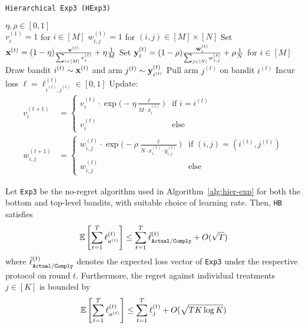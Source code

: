 \begin{algorithm}[tb]
   \caption{\texttt{Hierarchical Exp3 (HExp3)}}
   \label{alg:meta-exp2}
   \begin{algorithmic}   
       $\eta,\rho\in[0,1]$\\
      \STATE $v^{(1)}_{i}=1$ for $i\in[M]$
   	\STATE $w^{(1)}_{i,j}=1$ for $(i,j)\in[M]\times[N]$
	   \STATE Set ${\mathbf x}^{(t)} = (1-\eta) \frac{{\mathbf v}^{(t)}}{\sum_{i\in[M]} v^{(t)}_{i}} + \eta\frac{1}{M}$
	   \STATE Set ${\mathbf y}^{(t)}_{i} = (1-\rho)\frac{{\mathbf w}^{(t)}_{i}}{\sum_{j\in[N]} w^{(t)}_{i,j}} + \rho\frac{1}{N}$ for $i\in[M]$
	\STATE Draw bandit $i^{(t)}\sim {\mathbf x}^{(t)}$ and arm $j^{(t)}\sim {\mathbf y}^{(t)}_{i^{(t)}}$
	\STATE Pull arm $j^{(t)}$ on bandit $i^{(t)}$
	   \STATE Incur loss $\ell =\ell_{i^{(t)}, j^{(t)}}^{(t)}\in [0,1]$ 
	\STATE Update:
	\begin{align}
		v^{(t+1)}_i & = \begin{cases}
			v^{(t)}_{i}\cdot 
			\exp\big(-\eta \frac{\ell}{M\cdot x_{i}^{(t)}}\big) & \text{if } i=i^{(t)} \\
			v^{(t)}_{i} & \text{else}
		\end{cases}		 
		\\
		w^{(t+1)}_{i,j} & = \begin{cases}
			w^{(t)}_{i,j}\cdot \exp\big(-\rho\frac{\ell}{N\cdot x_i^{(t)}\cdot y_{i,j}^{(t)}}\big) 
			& \text{if }(i,j)=(i^{(t)}, j^{(t)}) \\
			w^{(t)}_{i,j} &\text{else}
		\end{cases}
	\end{align}
   	\ENDFOR
   	\end{algorithmic}
\end{algorithm}


\begin{thm}\label{thm:cexp}\eod
	Let \texttt{Exp3} be the no-regret algorithm used in Algorithm~\ref{alg:hier-exp} for both the bottom and top-level bandits, with suitable choice of learning rate. Then, \texttt{HB} satisfies
	\begin{equation}
		\operatorname*{\mathbb E}\left[\sum_{t=1}^T\ell^{(t)}_{a^{(t)}}\right]
		\leq \sum_{t=1}^T \tilde{\ell}^{(t)}_{{\texttt{Actual}}/{\texttt{Comply}}}
		+ O(\sqrt{T})
	\end{equation}
	where $\tilde{\ell}^{(t)}_{{\texttt{Actual}}/{\texttt{Comply}}}$ denotes the expected loss vector of \texttt{Exp3} under the respective protocol on round $t$. 
	Furthermore, the regret against individual treatments $j\in[K]$ is bounded by
	\begin{equation}
		\operatorname*{\mathbb E}\left[\sum_{t=1}^{T} \ell^{(t)}_{a^{(t)}}\right]
		\leq \sum_{t=1}^T\ell^{(t)}_{j}
		+ O(\sqrt{T K\log K})
	\end{equation}
\end{thm}

